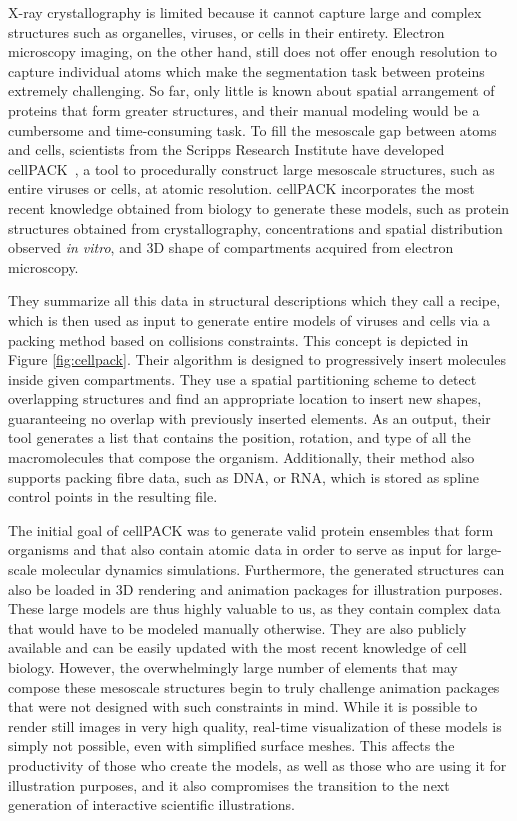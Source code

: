 X-ray crystallography is limited because it cannot capture large and complex structures such as organelles, viruses, or cells in their entirety.
Electron microscopy imaging, on the other hand, still does not offer enough resolution to capture individual atoms which make the segmentation task between proteins extremely challenging.
So far, only little is known about spatial arrangement of proteins that form greater structures, and their manual modeling would be a cumbersome and time-consuming task.
To fill the mesoscale gap between atoms and cells, scientists from the Scripps Research Institute have developed cellPACK~\cite{johnson2015cellpack}, a tool to procedurally construct large mesoscale structures, such as entire viruses or cells, at atomic resolution.
cellPACK incorporates the most recent knowledge obtained from biology to generate these models, such as protein structures obtained from crystallography, concentrations and spatial distribution observed \textit{in vitro}, and 3D shape of compartments acquired from electron microscopy.

They summarize all this data in structural descriptions which they call a recipe, which is then used as input to generate entire models of viruses and cells via a packing method based on collisions constraints. 
This concept is depicted in Figure \ref{fig:cellpack}.
Their algorithm is designed to progressively insert molecules inside given compartments.
They use a spatial partitioning scheme to detect overlapping structures and find an appropriate location to insert new shapes, guaranteeing no overlap with previously inserted elements.
As an output, their tool generates a list that contains the position, rotation, and type of all the macromolecules that compose the organism.
Additionally, their method also supports packing fibre data, such as DNA, or RNA, which is stored as spline control points in the resulting file.

The initial goal of cellPACK was to generate valid protein ensembles that form organisms and that also contain atomic data in order to serve as input for large-scale molecular dynamics simulations.
Furthermore, the generated structures can also be loaded in 3D rendering and animation packages for illustration purposes.
These large models are thus highly valuable to us, as they contain complex data that would have to be modeled manually otherwise.
They are also publicly available and can be easily updated with the most recent knowledge of cell biology.
However, the overwhelmingly large number of elements that may compose these mesoscale structures begin to truly challenge animation packages that were not designed with such constraints in mind.
While it is possible to render still images in very high quality, real-time visualization of these models is simply not possible, even with simplified surface meshes. 
This affects the productivity of those who create the models, as well as those who are using it for illustration purposes, and it also compromises the transition to the next generation of interactive scientific illustrations.

